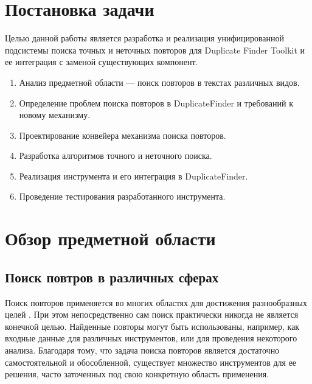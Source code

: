 \documentclass[14pt]{matmex-diploma-custom}
\begin{document}
\section{Постановка задачи}
Целью данной работы является разработка и реализация унифицированной подсистемы поиска точных и неточных повторов для Duplicate Finder Toolkit и ее интеграция с заменой существующих компонент.

\begin{enumerate}
	\item Анализ предметной области --- поиск повторов в текстах различных видов.
	\item Определение проблем поиска повторов в DuplicateFinder и требований к новому механизму.
	\item Проектирование конвейера механизма поиска повторов.
	\item Разработка алгоритмов точного и неточного поиска.
	\item Реализация инструмента и его интеграция в DuplicateFinder.
	\item Проведение тестирования разработанного инструмента.
\end{enumerate}

\section{Обзор предметной области}
\subsection{Поиск повтров в различных сферах}
Поиск повторов применяется во многих областях для достижения разнообразных целей \cite{bib:art:NearDupSurvey}. При этом непосредственно сам поиск практически никогда не является конечной целью. Найденные повторы могут быть использованы, например, как входные данные для различных инструментов, или для проведения некоторого анализа. Благодаря тому, что задача поиска повторов является достаточно самостоятельной и обособленной, существует множество инструментов для ее решения, часто заточенных под свою конкретную область применения.
\end{document}
